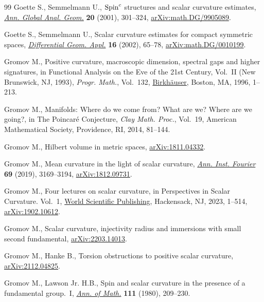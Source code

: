\begin{thebibliography}{99}
Goette S., Semmelmann U., {${\rm Spin}^c$} structures and scalar curvature
  estimates, \href{https://doi.org/10.1023/A:1013035721335}{\textit{Ann. Global Anal. Geom.}} \textbf{20} (2001), 301--324,
  \href{https://arxiv.org/abs/math.DG/9905089}{arXiv:math.DG/9905089}.

Goette S., Semmelmann U., Scalar curvature estimates for compact symmetric
  spaces, \href{https://doi.org/10.1016/S0926-2245(01)00068-7}{\textit{Differential Geom. Appl.}} \textbf{16} (2002), 65--78,
  \href{https://arxiv.org/abs/math.DG/0010199}{arXiv:math.DG/0010199}.


Gromov M., Positive curvature, macroscopic dimension, spectral gaps and higher
  signatures, in Functional {A}nalysis on the {E}ve of the 21st {C}entury,
  {V}ol.~{II} ({N}ew {B}runswick, {NJ}, 1993), \textit{Progr. Math.}, Vol.~132,
  \href{https://doi.org/10.1007/978-1-4612-4098-3_1}{Birkh\"auser}, Boston, MA, 1996, 1--213.

Gromov M., Manifolds: {W}here do we come from? {W}hat are we? {W}here are we
  going?, in The {P}oincar\'e {C}onjecture, \textit{Clay Math. Proc.}, Vol.~19,
  American Mathematical Society, Providence, RI, 2014, 81--144.

Gromov M., Hilbert volume in metric spaces, \href{https://arxiv.org/abs/1811.04332}{arXiv:1811.04332}.

Gromov M., Mean curvature in the light of scalar curvature, \href{https://doi.org/10.5802/aif.3347}{\textit{Ann. Inst.
  Fourier}} \textbf{69} (2019), 3169--3194, \href{https://arxiv.org/abs/1812.09731}{arXiv:1812.09731}.

Gromov M., Four lectures on scalar curvature, in Perspectives in {S}calar
  {C}urvature. {V}ol.~1, \href{https://doi.org/10.1142/9789811273223_0001}{World Scientific Publishing}, Hackensack, NJ, 2023,
  1--514, \href{https://arxiv.org/abs/1902.10612}{arXiv:1902.10612}.

Gromov M., Scalar curvature, injectivity radius and immersions with small
  second fundamental, \href{https://arxiv.org/abs/2203.14013}{arXiv:2203.14013}.

Gromov M., Hanke B., Torsion obstructions to positive scalar curvature,
  \href{https://arxiv.org/abs/2112.04825}{arXiv:2112.04825}.

Gromov M., Lawson Jr. H.B., Spin and scalar curvature in the presence of a
  fundamental group.~{I}, \href{https://doi.org/10.2307/1971198}{\textit{Ann. of Math.}} \textbf{111} (1980), 209--230.


\end{thebibliography}
